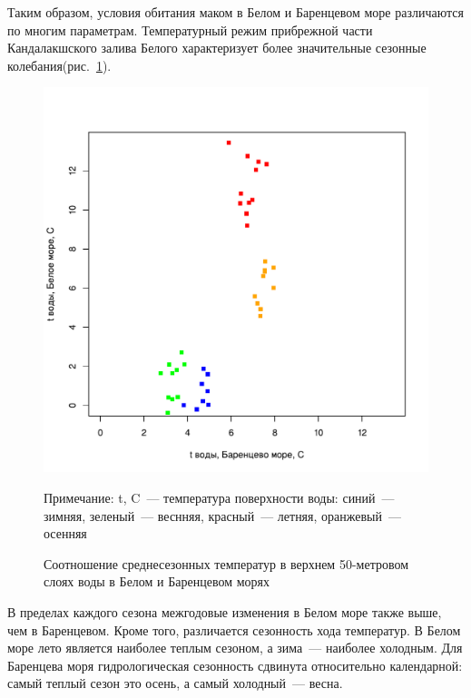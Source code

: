 \bigskip

Таким образом, условия обитания маком в Белом и Баренцевом море различаются по многим параметрам.
Температурный режим прибрежной части Кандалакшского залива Белого характеризует более значительные сезонные колебания(рис.~\ref{ris:temp_White_Barents}).
	\begin{figure}[p]
    \includegraphics[width=\textwidth]{../temperatures_water_air/temp_White_Barents1.pdf}
    \caption{Соотношение среднесезонных температур в верхнем 50-метровом слоях воды в Белом и Баренцевом морях}

{\footnotesize Примечание: t, C~--- температура поверхности воды: синий~--- зимняя, зеленый~--- веснняя, красный~--- летняя, оранжевый~--- осенняя}
    \label{ris:temp_White_Barents}
	\end{figure}
В пределах каждого сезона межгодовые изменения в Белом море также выше, чем в Баренцевом.
Кроме того, различается сезонность хода температур. 
В Белом море лето является наиболее теплым сезоном, а зима~--- наиболее холодным.
Для Баренцева моря гидрологическая сезонность сдвинута относительно календарной: самый теплый сезон это осень, а самый холодный~--- весна.

\afterpage{\clearpage}
